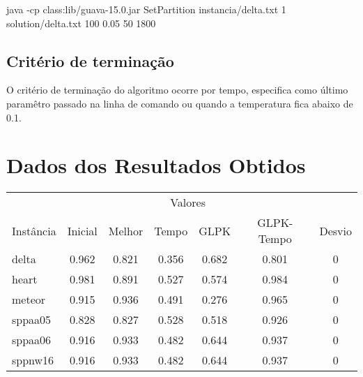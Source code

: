 \documentclass[a4paper, 10pt]{article} %
\begin{document}
java -cp class:lib/guava-15.0.jar SetPartition instancia/delta.txt 1 solution/delta.txt 100 0.05 50 1800

\subsection*{Critério de terminação}
O critério de terminação do algoritmo ocorre por tempo, especifica como último paramêtro passado na linha de comando ou quando a temperatura fica abaixo de 0.1.


\section*{Dados dos Resultados Obtidos}


\begin{table}[h] %
\centering %
\begin{tabular}{l c c c c c c} %
\toprule %
& \multicolumn{5}{c}{Valores} \\ %
\cmidrule(l){2-6} %
Instância & Inicial &  Melhor & Tempo & GLPK & GLPK-Tempo & Desvio\\ %
\midrule %
delta & 0.962 & 0.821 & 0.356 & 0.682 & 0.801 & 0\\ %
heart & 0.981 & 0.891 & 0.527 & 0.574 & 0.984 & 0\\ %
meteor & 0.915 & 0.936 & 0.491 & 0.276 & 0.965 & 0\\ %
sppaa05 & 0.828 & 0.827 & 0.528 & 0.518 & 0.926 & 0\\ %
sppaa06 & 0.916 & 0.933 & 0.482 & 0.644 & 0.937 & 0\\ %
sppnw16 & 0.916 & 0.933 & 0.482 & 0.644 & 0.937 & 0\\

\end{tabular}
\end{table}
\end{document}
